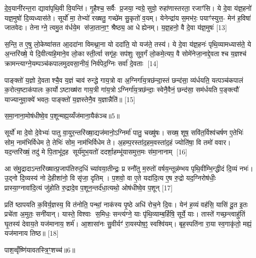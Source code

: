 दे॒व॒यानी॑रन्त॒रा द्यावा॑पृथि॒वी वि॒यन्ति॑। गृ॒हैश्च॒ सर्वैः प्र॒जया॒ न्वग्रे॒ सुवो॒ रुहा॑णास्तरता॒ रजाꣳ॑सि। ये दे॒वा य॑ज्ञ॒हनो॑ यज्ञ॒मुषो॑ दि॒व्यध्यास॑ते। सूर्यो॑ मा॒ तेभ्यो॑ रख्षतु॒ गच्छे॑म सु॒कृतो॑ व॒यम्। येनेन्द्रा॑य स॒मभ॑रः॒ पयाꣳ॑स्युत्त॒- मेन॑ ह॒विषा॑ जातवेदः। तेनाग्ने॒ त्वमु॒त व॑र्धये॒म स॑जा॒ताना॒ꣳ॒ श्रैष्ठ्य॒ आ धेह्येनम्। य॒ज्ञ॒हनो॒ वै दे॒वा य॑ज्ञ॒मुषः॑ [13]

स॒न्ति॒ त ए॒षु लो॒केष्वा॑सत आ॒ददा॑ना विमथ्ना॒ना यो ददा॑ति॒ यो यज॑ते॒ तस्य॑। ये दे॒वा य॑ज्ञ॒हनः॑ पृथि॒व्यामध्यास॑ते॒ ये अ॒न्तरि॑ख्षे॒ ये दि॒वीत्या॑हे॒माने॒व लो॒कास्ती॒र्त्वा सगृ॑हः॒ सप॑शुः सुव॒र्गं लो॒कमे॒त्यप॒ वै सोमे॑नेजा॒नाद्दे॒वताश्च य॒ज्ञश्च॑ क्रामन्त्याग्ने॒यम्पञ्च॑कपालमुदवसा॒नीयं॒ निर्व॑पेद॒ग्निः सर्वा॑ दे॒वताः [14]

पाङ्क्तो॑ य॒ज्ञो दे॒वताश्चै॒व य॒ज्ञं चाव॑ रुन्द्धे गाय॒त्रो वा अ॒ग्निर्गा॑य॒त्रछ॑न्दा॒स्तं छन्द॑सा॒ व्य॑र्धयति॒ यत्पञ्च॑कपालं क॒रोत्य॒ष्टाक॑पालः का॒र्योऽष्टाख्ष॑रा गाय॒त्री गा॑य॒त्रोऽग्निर्गा॑य॒त्रछ॑न्दाः॒ स्वेनै॒वैनं॒ छन्द॑सा॒ सम॑र्धयति प॒ङ्क्त्यौ॑ याज्यानुवा॒क्ये॑ भवतः॒ पाङ्क्तो॑ य॒ज्ञस्तेनै॒व य॒ज्ञान्नैति॑॥ [15]

{\scriptsize {स॒मा॒नाना॒मोष॑धीष्वे॒व प॒शून्मह्य॒य्यँज॑माना॒यैक॑ञ्च॥5॥}}

सूर्यो॑ मा दे॒वो दे॒वेभ्यः॑ पातु वा॒युर॒न्तरि॑ख्षा॒द्यज॑मानो॒ऽग्निर्मा॑ पातु॒ चख्षु॑षः। सख्ष॒ शूष॒ सवि॑त॒र्विश्व॑चर्\mbox{}षण ए॒तेभिः॑ सोम॒ नाम॑भिर्विधेम ते॒ तेभिः॑ सोम॒ नाम॑भिर्विधेम ते। अ॒हम्प॒रस्ता॑द॒हम॒वस्ता॑द॒हं ज्योति॑षा॒ वि तमो॑ ववार। यद॒न्तरि॑ख्षं॒ तदु॑ मे पि॒ताभू॑द॒ह सूर्य॑मुभ॒यतो॑ ददर्\mbox{}शा॒हम्भू॑यासमुत्त॒मः स॑मा॒नानाम् [16]

आ स॑मु॒द्रादाऽन्तरि॑ख्षात्प्र॒जाप॑तिरुद॒धिं च्या॑वया॒तीन्द्रः॒ प्र स्नौ॑तु म॒रुतो॑ वर्\mbox{}षय॒न्तून्न॑म्भय पृथि॒वीम्भि॒न्द्धीदं दि॒व्यं नभः॑। उ॒द्नो दि॒व्यस्य॑ नो दे॒हीशा॑नो॒ वि सृ॑जा॒ दृतिम्। प॒शवो॒ वा ए॒ते यदा॑दि॒त्य ए॒ष रु॒द्रो यद॒ग्निरोष॑धीः॒ प्रास्या॒ग्नावा॑दि॒त्यं जु॑होति रु॒द्रादे॒व प॒शून॒न्तर्द॑धा॒त्यथो॒ ओष॑धीष्वे॒व प॒शून् [17]

प्रति॑ ष्ठापयति क॒विर्य॒ज्ञस्य॒ वि त॑नोति॒ पन्थां॒ नाक॑स्य पृ॒ष्ठे अधि॑ रोच॒ने दि॒वः। येन॑ ह॒व्यं वह॑सि॒ यासि॑ दू॒त इ॒तः प्रचे॑ता अ॒मुतः॒ सनी॑यान्। यास्ते॒ विश्वाः स॒मिधः॒ सन्त्य॑ग्ने॒ याः पृ॑थि॒व्याम्ब॒र्\mbox{}हिषि॒ सूर्ये॒ याः। तास्ते॑ गच्छ॒न्त्वाहु॑तिं घृ॒तस्य॑ देवाय॒ते यज॑मानाय॒ शर्म॑। आ॒शासा॑नः सु॒वीर्यꣳ॑ रा॒यस्पोष॒ꣵ॒ स्वश्वि॑यम्। बृह॒स्पति॑ना रा॒या स्व॒गाकृ॑तो॒ मह्यं॒ यज॑मानाय तिष्ठ॥ [18]

{\scriptsize {पाश॒व्वृँष्णि॑यावतस्त्रि॒ꣳ॒शच्च॑॥6॥}}

